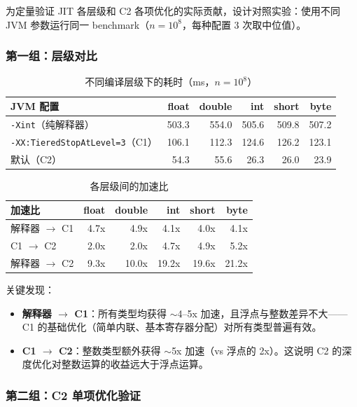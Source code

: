 \documentclass[12pt,a4paper]{article}
\begin{document}
为定量验证 JIT 各层级和 C2 各项优化的实际贡献，设计对照实验：使用不同 JVM 参数运行同一 benchmark（$n = 10^8$，每种配置 3 次取中位值）。

\subsubsection*{第一组：层级对比}

\begin{table}[H]
\centering
\begin{tabular}{l r r r r r}
\toprule
JVM 配置 & float & double & int & short & byte \\
\midrule
\texttt{-Xint}（纯解释器）                & 503.3 & 554.0 & 505.6 & 509.8 & 507.2 \\
\texttt{-XX:TieredStopAtLevel=3}（C1）     & 106.1 & 112.3 & 124.6 & 126.2 & 123.1 \\
默认（C2）                                  & 54.3  & 55.6  & 26.3  & 26.0  & 23.9  \\
\bottomrule
\end{tabular}
\caption{不同编译层级下的耗时（ms，$n=10^8$）}
\end{table}

\begin{table}[H]
\centering
\begin{tabular}{l r r r r r}
\toprule
加速比 & float & double & int & short & byte \\
\midrule
解释器 $\to$ C1 & 4.7x & 4.9x & 4.1x & 4.0x & 4.1x \\
C1 $\to$ C2      & 2.0x & 2.0x & 4.7x & 4.9x & 5.2x \\
解释器 $\to$ C2  & 9.3x & 10.0x & 19.2x & 19.6x & 21.2x \\
\bottomrule
\end{tabular}
\caption{各层级间的加速比}
\end{table}

关键发现：
\begin{itemize}
  \item \textbf{解释器 $\to$ C1}：所有类型均获得 ${\sim}$4--5x 加速，且浮点与整数差异不大——C1 的基础优化（简单内联、基本寄存器分配）对所有类型普遍有效。
  \item \textbf{C1 $\to$ C2}：整数类型额外获得 ${\sim}$5x 加速（vs 浮点的 2x）。这说明 C2 的深度优化对整数运算的收益远大于浮点运算。
\end{itemize}

\subsubsection*{第二组：C2 单项优化验证}
\end{document}
